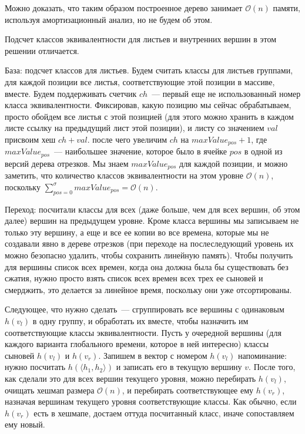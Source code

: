 Можно доказать, что таким образом построенное дерево занимает $\mathcal{O}(n)$ памяти, используя амортизационный анализ, но не будем об этом. 

Подсчет классов эквивалентности для листьев и внутренних вершин в этом решении отличается.

База: подсчет классов для листьев. Будем считать классы для листьев группами, для каждой позиции все листья, соответствующие этой позиции в массиве, вместе. Будем поддерживать счетчик $ch$~--- первый еще не использованный номер класса эквивалентности. Фиксировав, какую позицию мы сейчас обрабатываем, просто обойдем все листья с этой позицией (для этого можно хранить в каждом листе ссылку на предыдущий лист этой позиции), и листу со значением $val$ присвоим хеш $ch+val$. после чего увеличим $ch$ на $maxValue_{pos}+1$, где $maxValue_{pos}$~--- наибольшее значение, которое было в ячейке $pos$ в одной из версий дерева отрезков. Мы знаем $maxValue_{pos}$ для каждой позиции, и можно заметить, что количество классов эквивалентности на этом уровне $\mathcal{O}(n)$, поскольку $\sum \limits_{pos=0}^{\sigma} maxValue_{pos} = \mathcal{O}(n)$.

Переход: посчитали классы для всех (даже больше, чем для всех вершин, об этом далее) вершин на предыдущем уровне. Кроме класса вершины мы записываем не только эту вершину, а еще и все ее копии во все времена, которые мы не создавали явно в дереве отрезков (при переходе на послеследующий уровень их можно безопасно удалить, чтобы сохранить линейную память). Чтобы получить для вершины список всех времен, когда она должна была бы существовать без сжатия, нужно просто взять список всех времен всех трех ее сыновей и смерджить, это делается за линейное время, поскольку они уже отсортированы. 

Следующее, что нужно сделать~--- сгруппировать все вершины с одинаковым $h(v_l)$ в одну группу, и обработать их вместе, чтобы назначить им соответствующие классы эквивалентности. Пусть у очередной вершины (для каждого варианта глобального времени, которое в ней интересно) классы сыновей $h(v_l)$ и $h(v_r)$. Запишем в вектор с номером $h(v_l)$ напоминание: нужно посчитать $h(\langle h_1, h_2 \rangle)$ и записать его в текущую вершину $v$. После того, как сделали это для всех вершин текущего уровня, можно перебирать $h(v_l)$, очищать хешмап размера $\mathcal{O}(n)$, и перебирать соответствующее ему $h(v_r)$, назначая вершинам текущего уровня соответствующие классы. Как обычно, если $h(v_r)$ есть в хешмапе, достаем оттуда посчитанный класс, иначе сопоставляем ему новый. 

